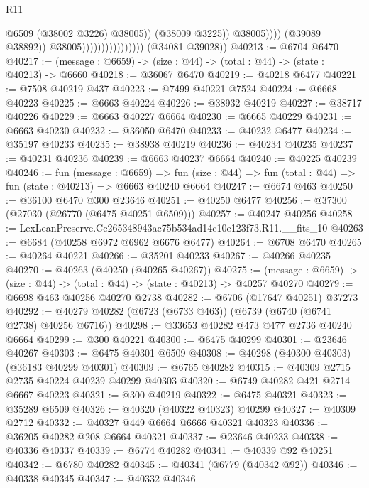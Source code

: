 \begin{lexlean}{R11}
\begin{coremodule}
                                                      @6509
                                                      (@38002 @3226)
                                                      @38005))
                                                  (@38009 @3225))
                                                @38005))))
                                        (@39089 @38892))
                                      @38005))))))))))))))))
      (@34081 @39028))
@40213 := @6704 @6470
@40217 := (message : @6659) -> (size : @44) -> (total : @44) -> (state : @40213) -> @6660
@40218 := @36067 @6470
@40219 := @40218 @6477
@40221 := @7508 @40219 @437
@40223 := @7499 @40221 @7524
@40224 := @6668 @40223
@40225 := @6663 @40224
@40226 := @38932 @40219
@40227 := @38717 @40226
@40229 := @6663 @40227 @6664
@40230 := @6665 @40229
@40231 := @6663 @40230
@40232 := @36050 @6470
@40233 := @40232 @6477
@40234 := @35197 @40233
@40235 := @38938 @40219
@40236 := @40234 @40235
@40237 := @40231 @40236
@40239 := @6663 @40237 @6664
@40240 := @40225 @40239
@40246 := fun (message : @6659) =>
  fun (size : @44) => fun (total : @44) => fun (state : @40213) => @6663 @40240 @6664
@40247 := @6674 @463
@40250 := @36100 @6470 @300 @23646
@40251 := @40250 @6477
@40256 := @37300 (@27030 (@26770 (@6475 @40251 @6509)))
@40257 := @40247 @40256
@40258 := LexLeanPreserve.Cc265348943ac75b534ad14c10e123f73.R11.__fits_10
@40263 := @6684 (@40258 @6972 @6962 @6676 @6477)
@40264 := @6708 @6470
@40265 := @40264 @40221
@40266 := @35201 @40233
@40267 := @40266 @40235
@40270 := @40263 (@40250 (@40265 @40267))
@40275 := (message : @6659) -> (size : @44) -> (total : @44) -> (state : @40213) -> @40257 @40270
@40279 := @6698 @463 @40256 @40270 @2738
@40282 := @6706 (@17647 @40251) @37273
@40292 := @40279 @40282 (@6723 (@6733 @463)) (@6739 (@6740 (@6741 @2738) @40256 @6716))
@40298 := @33653 @40282 @473 @477 @2736 @40240 @6664
@40299 := @300 @40221
@40300 := @6475 @40299
@40301 := @23646 @40267
@40303 := @6475 @40301 @6509
@40308 := @40298 (@40300 @40303) (@36183 @40299 @40301)
@40309 := @6765 @40282
@40315 := @40309 @2715 @2735 @40224 @40239 @40299 @40303
@40320 := @6749 @40282 @421 @2714 @6667 @40223
@40321 := @300 @40219
@40322 := @6475 @40321
@40323 := @35289 @6509
@40326 := @40320 (@40322 @40323) @40299
@40327 := @40309 @2712
@40332 := @40327 @449 @6664 @6666 @40321 @40323
@40336 := @36205 @40282 @208 @6664 @40321
@40337 := @23646 @40233
@40338 := @40336 @40337
@40339 := @6774 @40282
@40341 := @40339 @92 @40251
@40342 := @6780 @40282
@40345 := @40341 (@6779 (@40342 @92))
@40346 := @40338 @40345
@40347 := @40332 @40346

\end{coremodule}
\end{lexlean}
